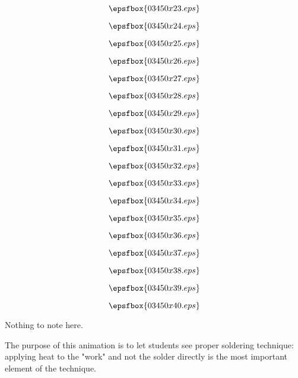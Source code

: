 \vfil \eject
$$\epsfbox{03450x23.eps}$$

\vfil \eject
$$\epsfbox{03450x24.eps}$$

\vfil \eject
$$\epsfbox{03450x25.eps}$$

\vfil \eject
$$\epsfbox{03450x26.eps}$$

\vfil \eject
$$\epsfbox{03450x27.eps}$$

\vfil \eject
$$\epsfbox{03450x28.eps}$$

\vfil \eject
$$\epsfbox{03450x29.eps}$$

\vfil \eject
$$\epsfbox{03450x30.eps}$$

\vfil \eject
$$\epsfbox{03450x31.eps}$$

\vfil \eject
$$\epsfbox{03450x32.eps}$$

\vfil \eject
$$\epsfbox{03450x33.eps}$$

\vfil \eject
$$\epsfbox{03450x34.eps}$$

\vfil \eject
$$\epsfbox{03450x35.eps}$$

\vfil \eject
$$\epsfbox{03450x36.eps}$$

\vfil \eject
$$\epsfbox{03450x37.eps}$$

\vfil \eject
$$\epsfbox{03450x38.eps}$$

\vfil \eject
$$\epsfbox{03450x39.eps}$$

\vfil \eject
$$\epsfbox{03450x40.eps}$$


\vfil \eject







Nothing to note here.







The purpose of this animation is to let students see proper soldering technique: applying heat to the "work" and not the solder directly is the most important element of the technique.




